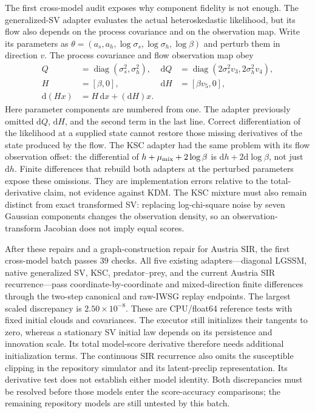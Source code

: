 \documentclass[11pt]{article}
\newcommand{\dd}{\mathrm{d}}
\begin{document}
The first cross-model audit exposes why component fidelity is not enough.
The generalized-SV adapter evaluates the actual heteroskedastic likelihood,
but its flow also depends on the process covariance and on the observation
map.  Write its parameters as
$\theta=(a_s,a_h,\log\sigma_s,\log\sigma_h,\log\beta)$ and perturb them in
direction $v$.  The process covariance and flow observation map obey
\begin{align}
 Q&=\operatorname{diag}(\sigma_s^2,\sigma_h^2),
 &\dd Q&=\operatorname{diag}(2\sigma_s^2v_3,2\sigma_h^2v_4),\\
 H&=[\beta,0], &\dd H&=[\beta v_5,0],\\
 \dd(Hx)&=H\,\dd x+(\dd H)x.
 \label{eq:repository-gsv-flow-tangent}
\end{align}
Here parameter components are numbered from one.  The adapter previously
omitted $\dd Q$, $\dd H$, and the second term in the last line.  Correct
differentiation of the likelihood at a supplied state cannot restore those
missing derivatives of the state produced by the flow.  The KSC adapter had
the same problem with its flow observation offset: the differential of
$h+\mu_{\rm mix}+2\log\beta$ is $\dd h+2\dd\log\beta$, not just $\dd h$.
Finite differences that rebuild both adapters at the perturbed parameters
expose these omissions.  They are implementation errors relative to the
total-derivative claim, not evidence against KDM.  The KSC mixture must also
remain distinct from exact transformed SV: replacing log-chi-square noise by
seven Gaussian components changes the observation density, so an
observation-transform Jacobian does not imply equal scores.

After these repairs and a graph-construction repair for Austria SIR, the first
cross-model batch passes 39 checks.  All five existing adapters---diagonal
LGSSM, native generalized SV, KSC, predator--prey, and the current Austria SIR
recurrence---pass coordinate-by-coordinate and mixed-direction finite
differences through the two-step canonical and raw-IWSG replay endpoints.
The largest scaled discrepancy is $2.50\times10^{-8}$.  These are CPU/float64
reference tests with fixed initial clouds and covariances.  The executor still
initializes their tangents to zero, whereas a stationary SV initial law depends
on its persistence and innovation scale.  Its total model-score derivative
therefore needs additional initialization terms.  The continuous SIR
recurrence also omits the susceptible clipping in the repository simulator
and its latent-preclip representation.  Its derivative test does not establish
either model identity.  Both discrepancies must be resolved before those
models enter the score-accuracy comparisons; the remaining repository models
are still untested by this batch.
\end{document}
